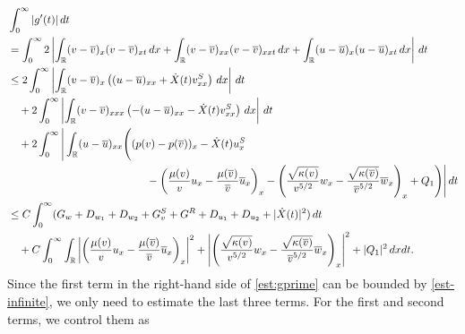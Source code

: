 \documentclass[11pt,reqno]{amsart}
\begin{document}
	\begin{equation}
	\begin{aligned}\label{est:gprime}
	&\int_0^\infty|g'(t)|\,dt\\
	&=\int_0^\infty 2\left|\int_\R (v-\ov)_x(v-\ov)_{xt}\,dx+\int_\R (v-\ov)_{xx}(v-\ov)_{xxt}\,dx+\int_\R (u-\ou)_x(u-\ou)_{xt}\,dx\right|\,dt\\
	&\le 2\int_0^\infty \left|\int_\R (v-\ov)_x\left((u-\ou)_{xx}+\dot{X}(t)\vs_{xx}\right)\,dx\right|\,dt\\
    &\quad + 2\int_0^\infty \left|\int_\R (v-\ov)_{xxx}\left(-(u-\ou)_{xx}-\dot{X}(t)\vs_{xx}\right)\,dx\right|\,dt\\
	&\quad + 2\int_0^\infty \Bigg|\int_\R (u-\ou)_{xx}\Bigg((p(v)-p(\ov))_{x}-\dot{X}(t) u^S_x \\
    &\hspace{4.5cm} -\left( \frac{\mu(v)}{v} u_x-\frac{\mu(\overline{v})}{\ov} \ou_x \right)_{x}-\left( \frac{\sqrt{\kappa(v)}}{v^{5/2}} w_x - \frac{\sqrt{\kappa(\overline{v})}}{\ov^{5/2}} \ow_x\right)_{x}  +Q_1 \Bigg)\Bigg|\,dt\\
	&\le C\int_0^\infty (G_w+D_{w_1}+D_{w_2}+G^S_v+G^R+D_{u_1}+D_{u_2}+|\dot{X}(t)|^2)\,dt\\
	&\quad + C\int_0^\infty \int_\R \left|\left( \frac{\mu(v)}{v} u_x-\frac{\mu(\overline{v})}{\ov} \ou_x \right)_{x}\right|^2+\left|\left( \frac{\sqrt{\kappa(v)}}{v^{5/2}} w_x - \frac{\sqrt{\kappa(\overline{v})}}{\ov^{5/2}} \ow_x\right)_{x}\right|^2 +|Q_1|^2 \,dxdt.
	\end{aligned}
	\end{equation}
	Since the first term in the right-hand side of \eqref{est:gprime} can be bounded by \eqref{est-infinite}, we only need to estimate the last three terms. For the first and second terms, we control them as
\end{document}
